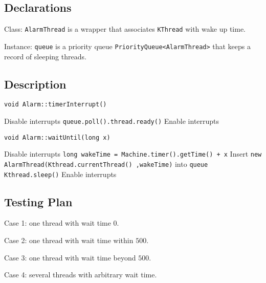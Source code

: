 \documentclass{article}
\begin{document}
\begin{spacing}{1.1}
    \subsection{Declarations}
    \begin{asparaitem}
    \item Class: \texttt{AlarmThread} is a wrapper that associates \texttt{KThread} with wake up time.
    \item Instance: \texttt{queue} is a priority queue \texttt{PriorityQueue<AlarmThread>} that keeps a record of sleeping threads.
    \end{asparaitem}

    \subsection{Description}
    \begin{algorithm}
      \caption{ \texttt{void Alarm::timerInterrupt()}}
      \begin{algorithmic}
	\STATE Disable interrupts
	\STATE \texttt{queue.poll().thread.ready()}
	\ENDWHILE
	\STATE Enable interrupts
      \end{algorithmic}
    \end{algorithm}

    \begin{algorithm}
      \caption{ \texttt{void Alarm::waitUntil(long x)}}
      \begin{algorithmic}
	\STATE Disable interrupts
	\STATE \texttt{long wakeTime = Machine.timer().getTime() + x}
	\STATE Insert \texttt{new AlarmThread(Kthread.currentThread() ,wakeTime)} into \texttt{queue}
	\STATE \texttt{Kthread.sleep()}
	\STATE Enable interrupts
      \end{algorithmic}
    \end{algorithm}
    \subsection{Testing Plan}
    \begin{asparaitem}
    \item Case 1: one thread with wait time $0$.
    \item Case 2: one thread with wait time within $500$.
    \item Case 3: one thread with wait time beyond $500$.
    \item Case 4: several threads with arbitrary wait time.
    \end{asparaitem}


\end{spacing}
\end{document}
